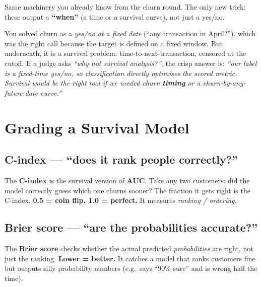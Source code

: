 \documentclass[11pt]{article}
\begin{document}
\begin{plainbox}
Same machinery you already know from the churn round. The only new trick: these output a
\textbf{``when''} (a time or a survival curve), not just a yes/no.
\end{plainbox}

\begin{churnbox}
You solved churn as a \emph{yes/no at a fixed date} (``any transaction in April?''), which was the
right call because the target is defined on a fixed window. But underneath, it is a survival problem:
time-to-next-transaction, censored at the cutoff. If a judge asks \emph{``why not survival
analysis?''}, the crisp answer is: \emph{``our label is a fixed-time yes/no, so classification
directly optimises the scored metric. Survival would be the right tool if we needed churn
\textbf{timing} or a churn-by-any-future-date curve.''}
\end{churnbox}

\section{Grading a Survival Model}

\subsection{C-index --- ``does it rank people correctly?''}
\begin{plainbox}
The \textbf{C-index} is the survival version of \textbf{AUC}. Take any two customers: did the model
correctly guess which one churns sooner? The fraction it gets right is the C-index.
\textbf{0.5 = coin flip, 1.0 = perfect.} It measures \emph{ranking / ordering}.
\end{plainbox}

\subsection{Brier score --- ``are the probabilities accurate?''}
\begin{plainbox}
The \textbf{Brier score} checks whether the actual predicted \emph{probabilities} are right, not just
the ranking. \textbf{Lower = better.} It catches a model that ranks customers fine but outputs silly
probability numbers (e.g.\ says ``90\% sure'' and is wrong half the time).
\end{plainbox}
\end{document}
